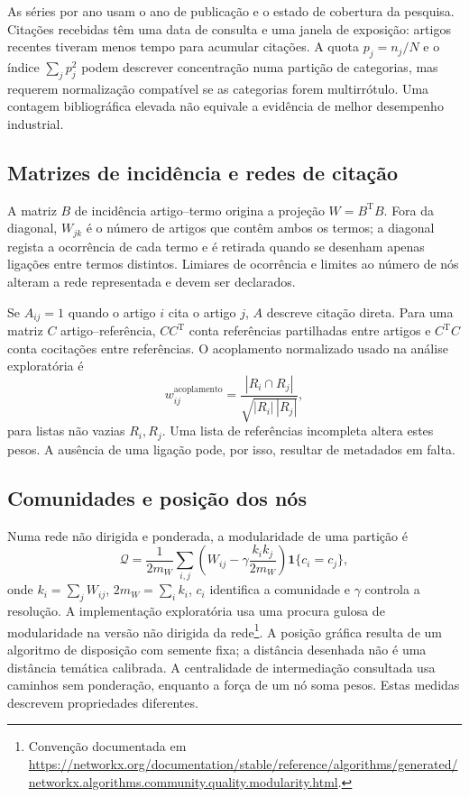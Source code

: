 As séries por ano usam o ano de publicação e o estado de cobertura da pesquisa. Citações recebidas têm uma data de consulta e uma janela de exposição: artigos recentes tiveram menos tempo para acumular citações. A quota $p_j=n_j/N$ e o índice $\sum_jp_j^2$ podem descrever concentração numa partição de categorias, mas requerem normalização compatível se as categorias forem multirrótulo. Uma contagem bibliográfica elevada não equivale a evidência de melhor desempenho industrial.

\subsection{Matrizes de incidência e redes de citação}
\label{sec:mat-redes}
A matriz $B$ de incidência artigo--termo origina a projeção $W=B^{\mathrm T}B$. Fora da diagonal, $W_{jk}$ é o número de artigos que contêm ambos os termos; a diagonal regista a ocorrência de cada termo e é retirada quando se desenham apenas ligações entre termos distintos. Limiares de ocorrência e limites ao número de nós alteram a rede representada e devem ser declarados.

Se $A_{ij}=1$ quando o artigo $i$ cita o artigo $j$, $A$ descreve citação direta. Para uma matriz $C$ artigo--referência, $CC^{\mathrm T}$ conta referências partilhadas entre artigos e $C^{\mathrm T}C$ conta cocitações entre referências. O acoplamento normalizado usado na análise exploratória é
\begin{equation}
w_{ij}^{\mathrm{acoplamento}}=
\frac{|R_i\cap R_j|}{\sqrt{|R_i|\,|R_j|}},
\label{eq:mat-acoplamento}
\end{equation}
para listas não vazias $R_i,R_j$. Uma lista de referências incompleta altera estes pesos. A ausência de uma ligação pode, por isso, resultar de metadados em falta.

\subsection{Comunidades e posição dos nós}
\label{sec:mat-modularidade}
Numa rede não dirigida e ponderada, a modularidade de uma partição é
\begin{equation}
\mathcal Q=\frac1{2m_W}\sum_{i,j}
\left(W_{ij}-\gamma\frac{k_i k_j}{2m_W}\right)\mathbf1\{c_i=c_j\},
\label{eq:mat-modularidade}
\end{equation}
onde $k_i=\sum_jW_{ij}$, $2m_W=\sum_ik_i$, $c_i$ identifica a comunidade e $\gamma$ controla a resolução. A implementação exploratória usa uma procura gulosa de modularidade na versão não dirigida da rede\footnote{Convenção documentada em \url{https://networkx.org/documentation/stable/reference/algorithms/generated/networkx.algorithms.community.quality.modularity.html}.}. A posição gráfica resulta de um algoritmo de disposição com semente fixa; a distância desenhada não é uma distância temática calibrada. A centralidade de intermediação consultada usa caminhos sem ponderação, enquanto a força de um nó soma pesos. Estas medidas descrevem propriedades diferentes.

